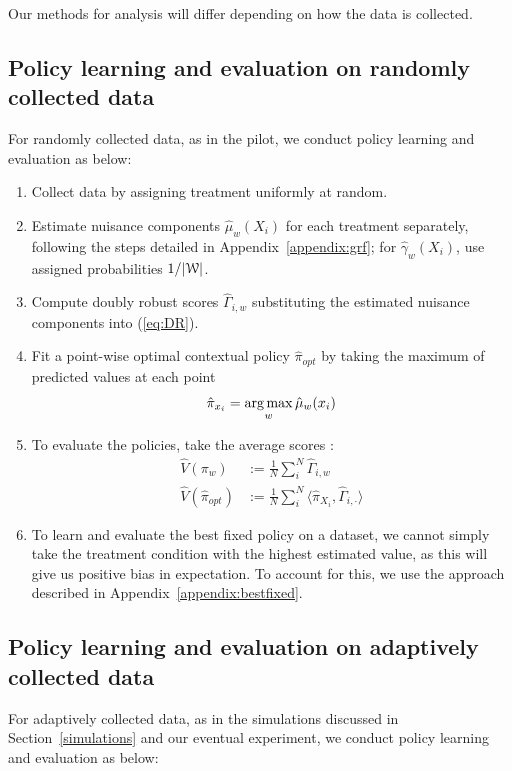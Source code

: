 \documentclass[letterpaper, 12pt, parskip=full,]{scrartcl}
\begin{document}
Our methods for analysis will differ depending on how the data is collected. 

\subsection{Policy learning and evaluation on randomly collected data}\label{randomlearning}
For randomly collected data, as in the pilot, we conduct policy learning and evaluation as below:

\begin{enumerate}
  \item Collect data by assigning treatment uniformly at random.
  \item Estimate nuisance components $\hat{\mu}_{w}(X_i)$ for each treatment separately, following the steps detailed in Appendix~\ref{appendix:grf}; for  $\hat\gamma_w(X_i)$, use assigned probabilities $1/|{\EuScript W}|$. 
  \item Compute doubly robust scores $\hat{\Gamma}_{i,w}$ substituting the estimated nuisance components into (\ref{eq:DR}). 
  \item Fit a point-wise optimal contextual policy $\hat{\pi}_{opt}$ by taking the maximum of predicted values at each point
    \begin{equation*}
\hat{\pi}_{x_i}  =     \operatorname*{arg\,max}_{w} \hat{\mu}_{w}(x_i) 
    \end{equation*}
  \item To evaluate the policies, take the average scores :
    \begin{align*}
          \hat{V}({\pi}_{w})  &:= \frac{1}{N} \sum_{i}^N \hat{\Gamma}_{i,w} \\
      \hat{V}(\hat{\pi}_{opt})  &:= \frac{1}{N} \sum_{i}^N\langle \hat{\pi}_{X_i}, \hat{\Gamma}_{i, \cdot}  \rangle
          \end{align*}
   \item To learn and evaluate the best fixed policy on a dataset, we cannot simply take the treatment condition with the highest estimated value, as this will give us positive bias in expectation. To account for this, we use the approach described in Appendix~\ref{appendix:bestfixed}. 
\end{enumerate}


\subsection{Policy learning and evaluation on adaptively collected data}\label{adaptiveearning}
For adaptively collected data, as in the simulations discussed in Section~\ref{simulations} and our eventual experiment, we conduct policy learning and evaluation as below:
\end{document}
